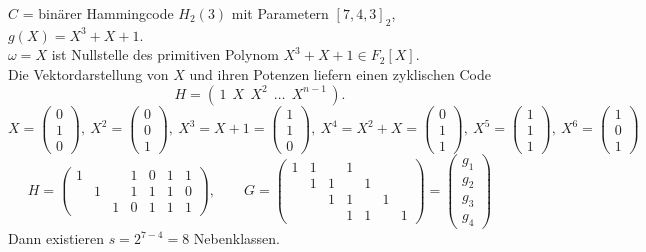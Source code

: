\begin{beispiel}
$C$ = binärer Hammingcode $H_2(3)$ mit Parametern $[7,4,3]_2$, $g(X) = X^3 + X + 1$.\\
$\omega = X$ ist Nullstelle des primitiven Polynom $X^3 + X + 1 \in F_2[X]$.\\
Die Vektordarstellung von $X$ und ihren Potenzen liefern einen zyklischen Code
\[
  H = (\,1 \ \ X \ \ X^2 \ \ \dots \ \ X^{n-1}\,).
\]
\[
  X = \begin{pmatrix} 0\\1\\0 \end{pmatrix},\
  X^2 = \begin{pmatrix} 0\\0\\1 \end{pmatrix},\
  X^3 = X + 1 = \begin{pmatrix} 1\\1\\0 \end{pmatrix},\
  X^4 = X^2 + X = \begin{pmatrix} 0\\1\\1 \end{pmatrix},\
  X^5 = \begin{pmatrix} 1\\1\\1 \end{pmatrix},\
  X^6 = \begin{pmatrix} 1\\0\\1 \end{pmatrix}
\]
\[
  H = \begin{pmatrix}
    1 &   &   & 1 & 0 & 1 & 1\\
      & 1 &   & 1 & 1 & 1 & 0\\
      &   & 1 & 0 & 1 & 1 & 1
  \end{pmatrix},\qquad
  G = \begin{pmatrix}
    1 & 1 &   & 1 &   &   &  \\
      & 1 & 1 &   & 1 &   &  \\
      &   & 1 & 1 &   & 1 &  \\
      &   &   & 1 & 1 &   & 1
  \end{pmatrix}
  = \begin{pmatrix} g_1\\ g_2\\ g_3\\ g_4 \end{pmatrix}
\]
Dann existieren $s = 2^{7-4} = 8$ Nebenklassen.


\end{beispiel}
